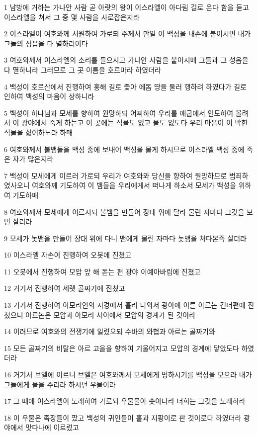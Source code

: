 \par 1 남방에 거하는 가나안 사람 곧 아랏의 왕이 이스라엘이 아다림 길로 온다 함을 듣고 이스라엘을 쳐서 그 중 몇 사람을 사로잡은지라
\par 2 이스라엘이 여호와께 서원하여 가로되 주께서 만일 이 백성을 내손에 붙이시면 내가 그들의 성읍을 다 멸하리이다
\par 3 여호와께서 이스라엘의 소리를 들으시고 가나안 사람을 붙이시매 그들과 그 성읍을 다 멸하니라 그러므로 그 곳 이름을 호르마라 하였더라
\par 4 백성이 호르산에서 진행하여 홍해 길로 좇아 에돔 땅을 둘러 행하려 하였다가 길로 인하여 백성의 마음이 상하니라
\par 5 백성이 하나님과 모세를 향하여 원망하되 어찌하여 우리를 애굽에서 인도하여 올려서 이 광야에서 죽게 하는고 이 곳에는 식물도 없고 물도 없도다 우리 마음이 이 박한 식물을 싫어하노라 하매
\par 6 여호와께서 불뱀들을 백성 중에 보내어 백성을 물게 하시므로 이스라엘 백성 중에 죽은 자가 많은지라
\par 7 백성이 모세에게 이르러 가로되 우리가 여호와와 당신을 향하여 원망하므로 범죄하였사오니 여호와께 기도하여 이 뱀들을 우리에게서 떠나게 하소서 모세가 백성을 위하여 기도하매
\par 8 여호와께서 모세에게 이르시되 불뱀을 만들어 장대 위에 달라 물린 자마다 그것을 보면 살리라
\par 9 모세가 놋뱀을 만들어 장대 위에 다니 뱀에게 물린 자마다 놋뱀을 쳐다본즉 살더라
\par 10 이스라엘 자손이 진행하여 오봇에 진쳤고
\par 11 오봇에서 진행하여 모압 앞 해 돋는 편 광야 이예아바림에 진쳤고
\par 12 거기서 진행하여 세렛 골짜기에 진쳤고
\par 13 거기서 진행하여 아모리인의 지경에서 흘러 나와서 광야에 이른 아르논 건너편에 진쳤으니 아르논은 모압과 아모리 사이에서 모압의 경계가 된 것이라
\par 14 이러므로 여호와의 전쟁기에 일렀으되 수바의 와헙과 아르논 골짜기와
\par 15 모든 골짜기의 비탈은 아르 고을을 향하여 기울어지고 모압의 경계에 닿았도다 하였더라
\par 16 거기서 브엘에 이르니 브엘은 여호와께서 모세에게 명하시기를 백성을 모으라 내가 그들에게 물을 주리라 하시던 우물이라
\par 17 그 때에 이스라엘이 노래하여 가로되 우물물아 솟아나라 너희는 그것을 노래하라
\par 18 이 우물은 족장들이 팠고 백성의 귀인들이 홀과 지팡이로 판 것이로다 하였더라 광야에서 맛다나에 이르렀고
